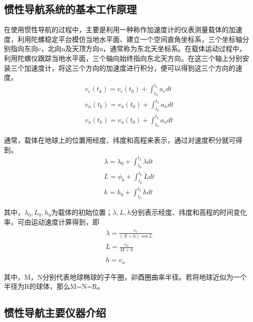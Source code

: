 \subsection{惯性导航系统的基本工作原理}
在使用惯性导航的过程中，主要是利用一种称作加速度计的仪表测量载体的加速度，利用陀螺稳定平台模仿当地水平面、建立一个空间直角坐标系，三个坐标轴分别指向东向e，北向n及天顶方向u，通常称为东北天坐标系。在载体运动过程中，利用陀螺仪跟踪当地水平面，三个轴向始终指向东北天方向。在这三个轴上分别安装三个加速度计，将这三个方向的加速度进行积分，便可以得到这三个方向的速度。
\begin{equation} \label{eq:eps}
\begin{aligned}
&v_{e}(t_{k})=v_{e}(t_{0})+\int_{t_{0}}^{t_{k}}a_{e}dt\\
&v_{n}(t_{k})=v_{n}(t_{0})+\int_{t_{0}}^{t_{k}}a_{n}dt\\
&v_{u}(t_{k})=v_{u}(t_{0})+\int_{t_{0}}^{t_{k}}a_{u}dt
\end{aligned}
\end{equation}
\par 通常，载体在地球上的位置用经度、纬度和高程来表示，通过对速度积分就可得到。
\begin{equation}
\begin{aligned}
&\lambda =\lambda_{0}+\int_{t_{0}}^{t_{k}}\dot{\lambda}dt \\
&L=\phi_{0}+\int_{t_{0}}^{t_{k}}\dot{L}dt \\
&h=h_{0}+\int_{t_{0}}^{t_{k}}\dot{h}dt
\end{aligned}
\end{equation}
\par 其中，$\lambda_{0},L_{0},h_{0}$为载体的初始位置；$\dot{\lambda},\dot{L},\dot{h}$分别表示经度、纬度和高程的时间变化率，可由运动速度计算得到，即
\begin{equation}
\begin{aligned}
&\dot{\lambda}=\frac{v_{e}}{(N+h)\cos L}\\
&\dot{L}=\frac{v_{n}}{M+h}\\
&\dot{h}=v_{u}
\end{aligned}
\end{equation}
\par 其中，M，N分别代表地球椭球的子午圈，卯酉圈曲率半径。若将地球近似为一个半径为R的球体，那么M=N=R。
\subsection{惯性导航主要仪器介绍\cite{3}}

